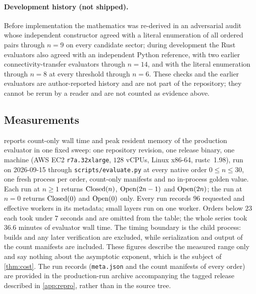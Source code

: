 \paragraph{Development history (not shipped).} Before implementation the
mathematics was re-derived in an adversarial audit whose independent
constructor agreed with a literal enumeration of all ordered pairs through
$n=9$ on every candidate sector; during development the Rust evaluators also
agreed with an independent Python reference, with two earlier
connectivity-transfer evaluators through $n=14$, and with the literal
enumeration through $n=8$ at every threshold through $n=6$. These checks and
the earlier evaluators are author-reported history and are not part of the
repository; they cannot be rerun by a reader and are not counted as evidence
above.

\subsection{Measurements}

 reports count-only wall time and peak resident memory of
the production evaluator in one fixed sweep: one repository revision, one
release binary, one machine (AWS EC2 \texttt{r7a.32xlarge}, $128$ vCPUs,
Linux x86-64, rustc~1.98), run on 2026-09-15 through
\texttt{scripts/evaluate.py} at every native order $0\le n\le30$, one fresh
process per order, count-only manifests and no in-process golden value. Each
run at $n\ge1$ returns $\operatorname{Closed}(n)$, $\operatorname{Open}(2n-1)$ and $\operatorname{Open}(2n)$; the run
at $n=0$ returns $\operatorname{Closed}(0)$ and $\operatorname{Open}(0)$ only. Every run records $96$
requested and effective workers in its metadata; small layers run on one
worker. Orders below $23$ each took under $7$ seconds and are omitted
from the table; the whole series took $36.6$ minutes of evaluator wall time.
The timing boundary is the child process: builds and any later verification
are excluded, while serialization and output of the count manifests are
included. These figures describe the measured range only and say nothing
about the asymptotic exponent, which is the subject of \cref{thm:cost}. The
run records (\texttt{meta.json} and the count manifests of every order) are
provided in the production-run archive accompanying the tagged release
described in \cref{app:repro}, rather than in the source tree.

